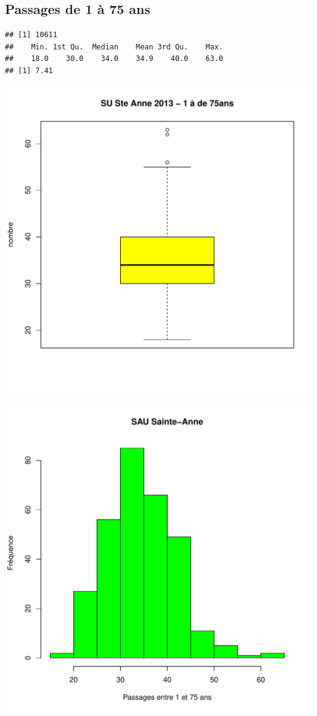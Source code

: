 \documentclass[12pt,english,french,twoside]{report}\usepackage[]{graphicx}\usepackage[]{color}
\makeatletter
\def\maxwidth{ %
  \ifdim\Gin@nat@width>\linewidth
    \linewidth
  \else
    \Gin@nat@width
  \fi
}
\newenvironment{kframe}{%
 \def\at@end@of@kframe{}%
 \ifinner\ifhmode%
  \def\at@end@of@kframe{\end{minipage}}%
  \begin{minipage}{\columnwidth}%
 \fi\fi%
 \def\FrameCommand##1{\hskip\@totalleftmargin \hskip-\fboxsep
 \colorbox{shadecolor}{##1}\hskip-\fboxsep
     \hskip-\linewidth \hskip-\@totalleftmargin \hskip\columnwidth}%
 \MakeFramed {\advance\hsize-\width
   \@totalleftmargin\z@ \linewidth\hsize
   \@setminipage}}%
 {\par\unskip\endMakeFramed%
 \at@end@of@kframe}
\newenvironment{knitrout}{}{} %
\makeatother
\begin{document}
\subsection{Passages de 1 à 75 ans}

\begin{knitrout}
\color{fgcolor}\begin{kframe}
\begin{verbatim}
## [1] 10611
##    Min. 1st Qu.  Median    Mean 3rd Qu.    Max. 
##    18.0    30.0    34.0    34.9    40.0    63.0
## [1] 7.41
\end{verbatim}
\end{kframe}
\includegraphics[width=\maxwidth]{figure/stAnne_1_75_passages1} 

\includegraphics[width=\maxwidth]{figure/stAnne_1_75_passages2} 


\end{knitrout}
\end{document}

